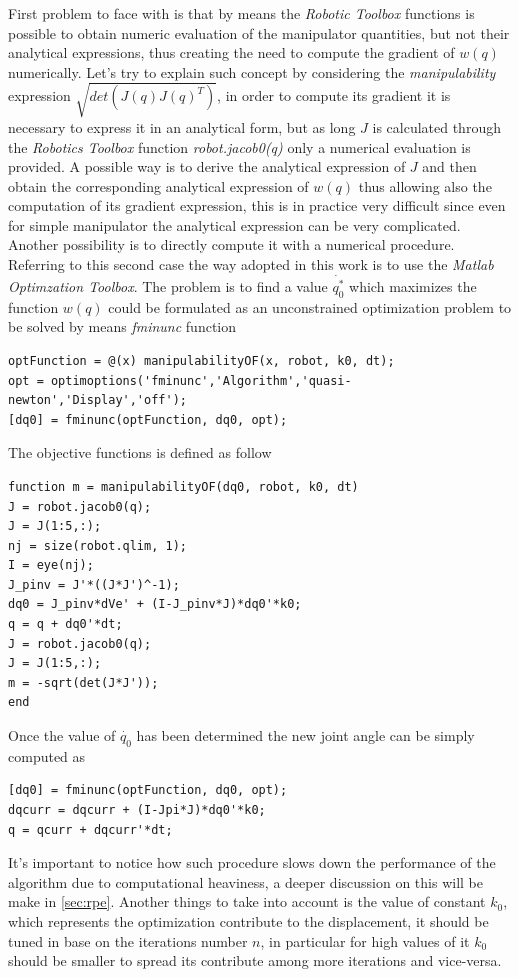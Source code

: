 First problem to face with is that by means the \textit{Robotic Toolbox} functions is possible to obtain numeric evaluation of the manipulator quantities, but not their analytical expressions, thus creating the need to compute the gradient of $w(q)$ numerically. Let's try to explain such concept by considering the \textit{manipulability} expression $\sqrt{det(J(q)J(q)^T)}$, in order to compute its gradient it is necessary to express it in an analytical form, but as long $J$ is calculated through the \textit{Robotics Toolbox} function \textit{robot.jacob0(q)} only a numerical evaluation is provided. A possible way is to derive the analytical expression of $J$ and then obtain the corresponding analytical expression of $w(q)$ thus allowing also the computation of its gradient expression, this is in practice very difficult since even for simple manipulator the analytical expression can be very complicated. Another possibility is to directly compute it with a numerical procedure. Referring to this second case the way adopted in this work is to use the \textit{Matlab Optimzation Toolbox}. The problem is to find a value $\dot{q^*_0}$ which maximizes the function $w(q)$ could be formulated as an unconstrained optimization problem to be solved by means \textit{fminunc} function
\begin{lstlisting}
optFunction = @(x) manipulabilityOF(x, robot, k0, dt);
opt = optimoptions('fminunc','Algorithm','quasi-newton','Display','off');	
[dq0] = fminunc(optFunction, dq0, opt);
\end{lstlisting}
The objective functions is defined as follow
\begin{lstlisting}
function m = manipulabilityOF(dq0, robot, k0, dt)
J = robot.jacob0(q);
J = J(1:5,:);
nj = size(robot.qlim, 1);
I = eye(nj);
J_pinv = J'*((J*J')^-1);
dq0 = J_pinv*dVe' + (I-J_pinv*J)*dq0'*k0;
q = q + dq0'*dt;
J = robot.jacob0(q);
J = J(1:5,:);
m = -sqrt(det(J*J'));
end
\end{lstlisting}

Once the value of $\dot{q_0}$ has been determined the new joint angle can be simply computed as
\begin{lstlisting}
[dq0] = fminunc(optFunction, dq0, opt);
dqcurr = dqcurr + (I-Jpi*J)*dq0'*k0;
q = qcurr + dqcurr'*dt;
\end{lstlisting}

It's important to notice how such procedure slows down the performance of the algorithm due to computational heaviness, a deeper discussion on this will be make in \ref{sec:rpe}. Another things to take into account is the value of constant $k_0$, which represents the optimization contribute to the displacement, it should be tuned in base on the iterations number $n$, in particular for high values of it $k_0$ should be smaller to spread its contribute among more iterations and vice-versa.